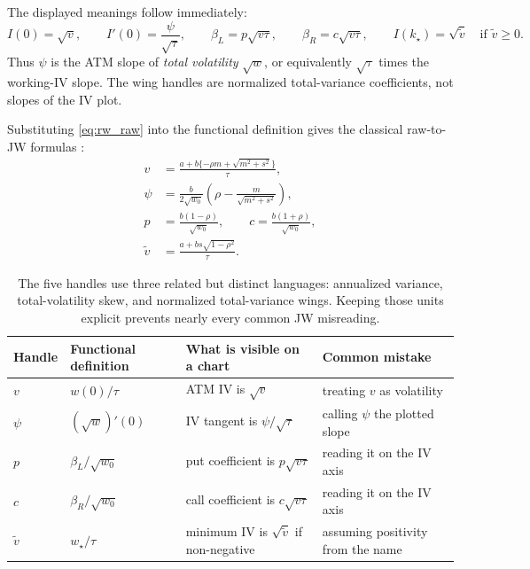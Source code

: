 \documentclass[11pt]{article}
\newcommand{\vmin}{\widetilde v}
\newcommand{\wmin}{w_\star}
\newcommand{\kmin}{k_\star}
\newcommand{\betL}{\beta_L}
\newcommand{\betR}{\beta_R}
\begin{document}
The displayed meanings follow immediately:
\begin{equation}
I(0)=\sqrt v,\qquad I'(0)=\frac{\psi}{\sqrt\tau},\qquad
\betL=p\sqrt{v\tau},\qquad \betR=c\sqrt{v\tau},\qquad
I(\kmin)=\sqrt{\vmin}\quad\text{if }\vmin\ge0.
\label{eq:rw_jw_display}
\end{equation}
Thus $\psi$ is the ATM slope of \emph{total volatility} $\sqrt w$, or
equivalently $\sqrt\tau$ times the working-IV slope.  The wing handles are
normalized total-variance coefficients, not slopes of the IV plot.

Substituting \eqref{eq:rw_raw} into the functional definition gives the
classical raw-to-JW formulas \cite[Sec.~3.3]{GatheralJacquier2014}:
\begin{equation}
\begin{aligned}
v&=\frac{a+b\{-\rho m+\sqrt{m^2+s^2}\}}{\tau},\\
\psi&=\frac{b}{2\sqrt{w_0}}
       \left(\rho-\frac{m}{\sqrt{m^2+s^2}}\right),\\
p&=\frac{b(1-\rho)}{\sqrt{w_0}},\qquad
c=\frac{b(1+\rho)}{\sqrt{w_0}},\\
\vmin&=\frac{a+bs\sqrt{1-\rho^2}}{\tau}.
\end{aligned}
\label{eq:rw_raw_to_jw}
\end{equation}

\begin{table}[H]
\centering
\small
\begin{tabular}{@{}p{}p{}p{}p{}@{}}
\toprule
Handle & Functional definition & What is visible on a chart & Common mistake\\
\midrule
$v$ & $w(0)/\tau$ & ATM IV is $\sqrt v$ & treating $v$ as volatility\\
$\psi$ & $(\sqrt w)'(0)$ & IV tangent is $\psi/\sqrt\tau$ & calling $\psi$ the plotted slope\\
$p$ & $\betL/\sqrt{w_0}$ & put coefficient is $p\sqrt{v\tau}$ & reading it on the IV axis\\
$c$ & $\betR/\sqrt{w_0}$ & call coefficient is $c\sqrt{v\tau}$ & reading it on the IV axis\\
$\vmin$ & $\wmin/\tau$ & minimum IV is $\sqrt{\vmin}$ if non-negative & assuming positivity from the name\\
\bottomrule
\end{tabular}
\caption{The five handles use three related but distinct languages: annualized
variance, total-volatility skew, and normalized total-variance wings.  Keeping
those units explicit prevents nearly every common JW misreading.}
\label{tab:rw_handles}
\end{table}
\end{document}
